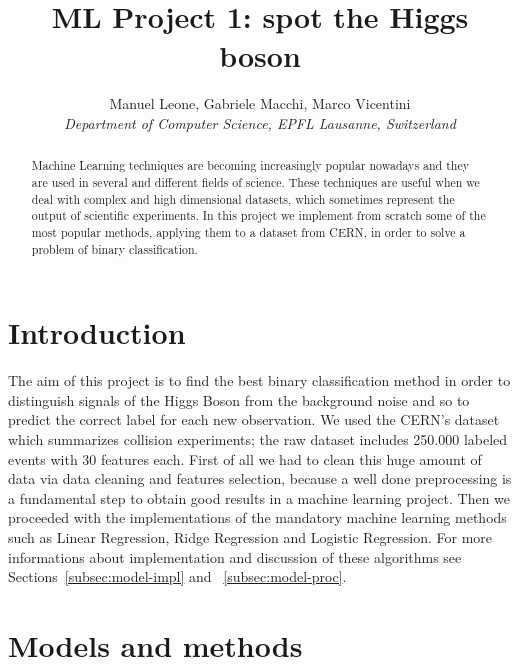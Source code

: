 \documentclass[10pt,article]{IEEEtran}
\begin{document}
\title{ML Project 1: spot the Higgs boson}

\author{
  Manuel Leone, Gabriele Macchi, Marco Vicentini\\
  \textit{Department of Computer Science, EPFL Lausanne, Switzerland}
}

\maketitle

\begin{abstract}
Machine Learning techniques are becoming increasingly popular nowadays and they are used in several and different fields of science.  These techniques are useful when we deal with complex and high dimensional datasets, which sometimes represent the output of scientific experiments. In this project we implement from scratch some of the most popular methods, applying them to a dataset from CERN, in order to solve a problem of binary classification.
\end{abstract}

\section{Introduction}

The aim of this project is to find the best binary classification method in order to distinguish signals of the Higgs Boson from the background noise and so to predict the correct label for each new observation. We used the CERN’s dataset which summarizes collision experiments; the raw dataset includes 250.000 labeled events with 30 features each. First of all we had to clean this huge amount of data via data cleaning and features selection, because a well done preprocessing is a fundamental step to obtain good results in a machine learning project. Then we proceeded with the implementations of the mandatory machine learning methods such as Linear Regression, Ridge Regression and Logistic Regression. For more informations about implementation and discussion of these algorithms see Sections~\ref{subsec:model-impl} and ~\ref{subsec:model-proc}.

\section{Models and methods}
\label{sec:models-methods}
\end{document}
